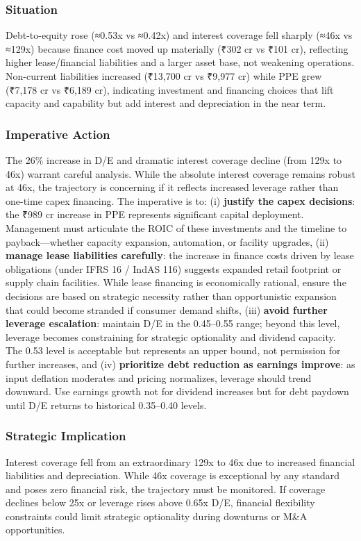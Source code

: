 \documentclass[12pt, a4paper]{report}
\begin{document}
\subsubsection{Situation}
Debt-to-equity rose (≈0.53x vs ≈0.42x) and interest coverage fell sharply (≈46x vs ≈129x) because finance cost moved up materially (₹302 cr vs ₹101 cr), reflecting higher lease/financial liabilities and a larger asset base, not weakening operations. Non-current liabilities increased (₹13,700 cr vs ₹9,977 cr) while PPE grew (₹7,178 cr vs ₹6,189 cr), indicating investment and financing choices that lift capacity and capability but add interest and depreciation in the near term.

\subsubsection{Imperative Action}
The 26\% increase in D/E and dramatic interest coverage decline (from 129x to 46x) warrant careful analysis. While the absolute interest coverage remains robust at 46x, the trajectory is concerning if it reflects increased leverage rather than one-time capex financing. The imperative is to: (i) \textbf{justify the capex decisions}: the ₹989 cr increase in PPE represents significant capital deployment. Management must articulate the ROIC of these investments and the timeline to payback—whether capacity expansion, automation, or facility upgrades, (ii) \textbf{manage lease liabilities carefully}: the increase in finance costs driven by lease obligations (under IFRS 16 / IndAS 116) suggests expanded retail footprint or supply chain facilities. While lease financing is economically rational, ensure the decisions are based on strategic necessity rather than opportunistic expansion that could become stranded if consumer demand shifts, (iii) \textbf{avoid further leverage escalation}: maintain D/E in the 0.45–0.55 range; beyond this level, leverage becomes constraining for strategic optionality and dividend capacity. The 0.53 level is acceptable but represents an upper bound, not permission for further increases, and (iv) \textbf{prioritize debt reduction as earnings improve}: as input deflation moderates and pricing normalizes, leverage should trend downward. Use earnings growth not for dividend increases but for debt paydown until D/E returns to historical 0.35–0.40 levels.

\subsubsection{Strategic Implication}
Interest coverage fell from an extraordinary 129x to 46x due to increased financial liabilities and depreciation. While 46x coverage is exceptional by any standard and poses zero financial risk, the trajectory must be monitored. If coverage declines below 25x or leverage rises above 0.65x D/E, financial flexibility constraints could limit strategic optionality during downturns or M\&A opportunities.
\end{document}
